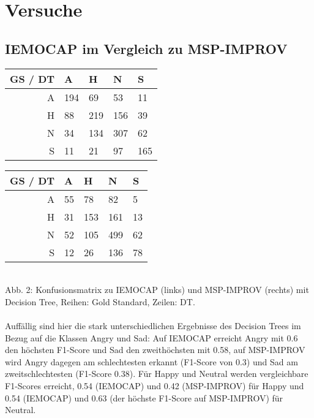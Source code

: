 \documentclass{article} %
\begin{document}
\section{Versuche}
\subsection{IEMOCAP im Vergleich zu MSP-IMPROV}
\begin{tabular}{|r|llll|}
\hline
GS / DT & A & H & N & S \\
\hline
A & 194 & 69 & 53 & 11 \\
H & 88 & 219 & 156 & 39 \\
N & 34 & 134 & 307 & 62 \\
S & 11 & 21 & 97 & 165 \\
\hline
\end{tabular}
\begin{tabular}{|r|llll|}
\hline
GS / DT & A & H & N & S \\
\hline
A & 55 & 78 & 82 & 5 \\
H & 31 & 153 & 161 & 13 \\
N & 52 & 105 & 499 & 62 \\
S & 12 & 26 & 136 & 78 \\
\hline
\end{tabular} \\
Abb. 2: Konfusionsmatrix zu IEMOCAP (links) und MSP-IMPROV (rechts) mit Decision Tree, Reihen: Gold Standard, Zeilen: DT. \\ \\
Auffällig sind hier die stark unterschiedlichen Ergebnisse des Decision Trees im Bezug auf die Klassen Angry und Sad: Auf IEMOCAP erreicht Angry mit 0.6 den höchsten F1-Score und Sad den zweithöchsten mit 0.58, auf MSP-IMPROV wird Angry dagegen am schlechtesten erkannt (F1-Score von 0.3) und Sad am zweitschlechtesten (F1-Score 0.38). Für Happy und Neutral werden vergleichbare F1-Scores erreicht, 0.54 (IEMOCAP) und 0.42 (MSP-IMPROV) für Happy und 0.54 (IEMOCAP) und 0.63 (der höchste F1-Score auf MSP-IMPROV) für Neutral. 
\end{document}
